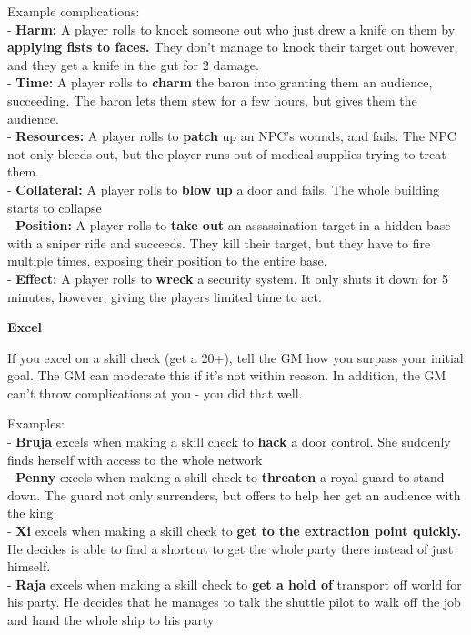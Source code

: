 Example complications:\\
- \textbf{Harm:} A player rolls to knock someone out who just drew a knife on them by \textbf{applying fists to faces.} They don’t manage to knock their target out however, and they get a knife in the gut for 2 damage.\\
- \textbf{Time:} A player rolls to \textbf{charm} the baron into granting them an audience, succeeding. The baron lets them stew for a few hours, but gives them the audience.\\
- \textbf{Resources:} A player rolls to \textbf{patch} up an NPC’s wounds, and fails. The NPC not only bleeds out, but the player runs out of medical supplies trying to treat them.\\
- \textbf{Collateral:} A player rolls to \textbf{blow up} a door and fails. The whole building starts to collapse\\
- \textbf{Position:} A player rolls to \textbf{take out} an assassination target in a hidden base with a sniper rifle and succeeds. They kill their target, but they have to fire multiple times, exposing their position to the entire base.\\
- \textbf{Effect:} A player rolls to \textbf{wreck} a security system. It only shuts it down for 5 minutes, however, giving the players limited time to act.

                                                      \textbf{Excel} 

If you excel on a skill check (get a 20+), tell the GM how you surpass your initial goal. The GM can moderate this if it’s not within reason. In addition, the GM can’t throw complications at you - you did that well. 

Examples:\\
- \textbf{Bruja} excels when making a skill check to \textbf{hack} a door control. She suddenly finds herself with access to the whole network\\
- \textbf{Penny} excels when making a skill check to \textbf{threaten} a royal guard to stand down. The guard not only surrenders, but offers to help her get an audience with the king\\
- \textbf{Xi} excels when making a skill check to \textbf{get to the extraction point quickly.} He decides is able to find a shortcut to get the whole party there instead of just himself.\\
- \textbf{Raja} excels when making a skill check to \textbf{get a hold of} transport off world for his party. He decides that he manages to talk the shuttle pilot to walk off the job and hand the whole ship to his party

